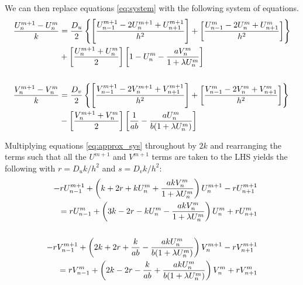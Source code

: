 We can then replace equations \eqref{eq:system} with the following system of
equations.
\begin{subequations} \label{eq:approx_sys}
\begin{align}
    \frac{U_{n}^{m+1} - U_{n}^{m}}{k} &=
        \frac{D_u}{2} \left\{
           \left[ \frac{U_{n-1}^{m+1}-2U_{n}^{m+1}+U_{n+1}^{m+1}}{h^2} \right] +
            \left[ \frac{U_{n-1}^{m}-2U_{n}^{m}+U_{n+1}^{m}}{h^2} \right]
        \right\} \notag\\
        &+ \left[ \frac{U_n^{m+1} + U_n^m}{2} \right]
           \left[ 1 - U_n^m - \frac{a V_n^m}{1 + \lambda U_n^m} \right]
           \label{eq:approx_prey}
        \\ \notag
        \\
    \frac{V_{n}^{m+1} - V_{n}^{m}}{k} &=
        \frac{D_v}{2} \left\{
           \left[ \frac{V_{n-1}^{m+1}-2V_{n}^{m+1}+V_{n+1}^{m+1}}{h^2} \right] +
           \left[ \frac{V_{n-1}^{m}-2V_{n}^{m}+V_{n+1}^{m}}{h^2} \right]
        \right\} \notag\\
        &- \left[ \frac{V_n^{m+1} + V_n^m}{2} \right]
           \left[ \frac{1}{ab} - \frac{a U_n^m}{b ( 1 + \lambda U_n^m )} \right]
           \label{eq:approx_pred}
\end{align}
\end{subequations}

Multiplying equations \eqref{eq:approx_sys} throughout by $2k$ and rearranging
the terms such that all the $U^{m+1}$ and $V^{m+1}$ terms are taken to the LHS
yields the following with $r = D_u k / h^2$ and $s = D_v k / h^2$:
\begin{subequations} \label{eq:rearranged_approx_sys}
\begin{align}
    -r U_{n-1}^{m+1} +
    \left(
        k + 2r + k U_n^m + \frac{a k V_n^m}{1 + \lambda U_n^m}
    \right)
    U_n^{m+1} - r U_{n+1}^{m+1} \notag
    \\
    = r U_{n-1}^m +
    \left(
        3k - 2r - k U_n^m - \frac{a k V_n^m}{1 + \lambda U_n^m}
    \right)
    U_n^m + r U_{n+1}^m
    \\
    \notag
    \\
    -r V_{n-1}^{m+1} +
    \left(
        2k + 2r + \frac{k}{ab} - \frac{a k U_n^m}{b ( 1 + \lambda U_n^m )}
    \right)
    V_n^{m+1} - r V_{n+1}^{m+1} \notag
    \\
    = r V_{n-1}^m +
    \left(
        2k - 2r - \frac{k}{ab} + \frac{a k U_n^m}{b ( 1 + \lambda U_n^m )}
    \right)
    V_n^m + r V_{n+1}^m
\end{align}
\end{subequations}

